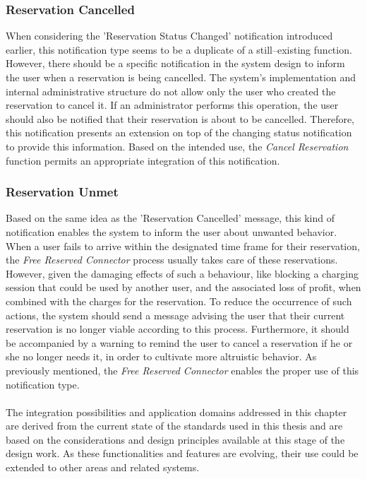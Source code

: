 \subsubsection{Reservation Cancelled}
\label{ch:Design:sec:Reservation System:ssec:Notification Capabilities:sssec:Reservation Cancelled}

When considering the 'Reservation Status Changed' notification introduced earlier, this notification type seems to be a duplicate of a still--existing function.
However, there should be a specific notification in the system design to inform the user when a reservation is being cancelled. The system's implementation and internal administrative structure do not allow only the user who created the reservation to cancel it. 
If an administrator performs this operation, the user should also be notified that their reservation is about to be cancelled. 
Therefore, this notification presents an extension on top of the changing status notification to provide this information.
Based on the intended use, the \textit{Cancel Reservation} function permits an appropriate integration of this notification.

\subsubsection{Reservation Unmet}
\label{ch:Design:sec:Reservation System:ssec:Notification Capabilities:sssec:Reservation Unmet}

Based on the same idea as the 'Reservation Cancelled' message, this kind of notification enables the system to inform the user about unwanted behavior.
When a user fails to arrive within the designated time frame for their reservation, the \textit{Free Reserved Connector} process usually takes care of these reservations. 
However, given the damaging effects of such a behaviour, like blocking a charging session that could be used by another user, and the associated loss of profit, when combined with the charges for the reservation.
To reduce the occurrence of such actions, the system should send a message advising the user that their current reservation is no longer viable according to this process. Furthermore, it should be accompanied by a warning to remind the user to cancel a reservation if he or she no longer needs it, in order to cultivate more altruistic behavior.
As previously mentioned, the \textit{Free Reserved Connector} enables the proper use of this notification type. \\ \\
\noindent The integration possibilities and application domains addressed in this chapter are derived from the current state of the standards used in this thesis and are based on the considerations and design principles available at this stage of the design work. 
As these functionalities and features are evolving, their use could be extended to other areas and related systems.
